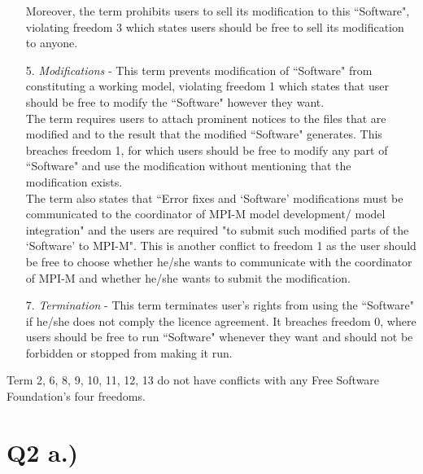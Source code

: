 \documentclass[a4wide, 10pt]{article}
\begin{document}
\begin{enumerate}
 Moreover, the term prohibits users to sell its modification to this ``Software", violating freedom 3 which states users should be free to sell its modification to anyone. 
\item[5.] \emph{Modifications}
- This term prevents modification of ``Software" from constituting a working model, violating freedom 1 which states that user should be free to modify the ``Software" however they want.
\vspace{1ex}
\\The term requires users to attach prominent notices to the files that are modified and to the result that the modified ``Software" generates. This breaches freedom 1, for which users should be free to modify any part of ``Software" and use the modification without mentioning that the modification exists. 
\vspace{1ex}
\\The term also states that ``Error fixes and `Software' modifications must be communicated to the coordinator of MPI-M model development/ model integration" and the users are required "to submit such modified parts of the `Software' to MPI-M". This is another conflict to freedom 1 as the user should be free to choose whether he/she wants to communicate with the coordinator of MPI-M and whether he/she wants to submit the modification. 
\item[7.] \emph{Termination}
- This term terminates user's rights from using the ``Software" if he/she does not comply the licence agreement. It breaches freedom 0, where users should be free to run ``Software" whenever they want and should not be forbidden or stopped from making it run.
\end{enumerate}
\vspace{-1ex} 
Term 2, 6, 8, 9, 10, 11, 12, 13 do not have conflicts with any Free Software Foundation's four freedoms.

\section*{Q2 a.)}
\end{document}
